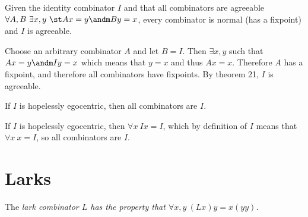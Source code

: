 


\begin{thm}

Given the identity combinator $I$ and that all combinators are agreeable \ie
$\forall A, B\ \exists x, y\ \st Ax = y \andm By = x$, every combinator is
normal (has a fixpoint) and $I$ is agreeable.

\bp

Choose an arbitrary combinator $A$ and let $B = I$.  Then $\exists x, y$ such
that $Ax = y \andm Iy = x$ which means that $y = x$ and thus $Ax = x$.
Therefore $A$ has a fixpoint, and therefore all combinators have fixpoints.  By
theorem 21, $I$ is agreeable.  \qedhere

\ep

\end{thm}


\begin{thm}

If $I$ is hopelessly egocentric, then all combinators are $I$.

\bp

If $I$ is hopelessly egocentric, then $\forall x\ Ix = I$, which by definition
of $I$ means that $\forall x\ x = I$, so all combinators are $I$.  \qedhere

\ep

\end{thm}

\section{Larks}

\begin{defn}

The \it{lark} combinator $L$ has the property that $\forall x, y\ (Lx)y =
x(yy)$.

\end{defn}


